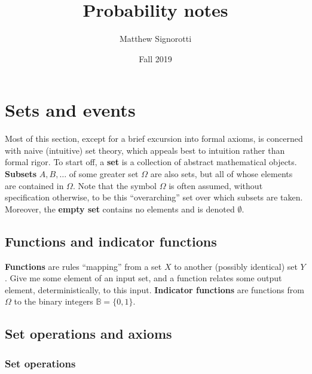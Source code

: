 \documentclass[12pt]{article}
\title{Probability notes}
\author{Matthew Signorotti}
\date{Fall 2019}
\begin{document}
\maketitle

\tableofcontents

\section{Sets and events}

Most of this section, except for a brief excursion into formal axioms, is concerned with naive (intuitive) set theory, which appeals best to intuition rather than formal rigor. To start off, a \textbf{set} is a collection of abstract mathematical objects. \textbf{Subsets} $A, B, \ldots$ of some greater set $\Omega$ are also sets, but all of whose elements are contained in $\Omega$. Note that the symbol $\Omega$ is often assumed, without specification otherwise, to be this ``overarching'' set over which subsets are taken. Moreover, the \textbf{empty set} contains no elements and is denoted $\emptyset$.

\subsection{Functions and indicator functions}

\textbf{Functions} are rules ``mapping'' from a set $X$ to another (possibly identical) set $Y$. Give me some element of an input set, and a function relates some output element, deterministically, to this input. \textbf{Indicator functions} are functions from $\Omega$ to the binary integers $\mathbb B = \{ 0, 1 \}$.

\subsection{Set operations and axioms}

\subsubsection{Set operations}
\end{document}
